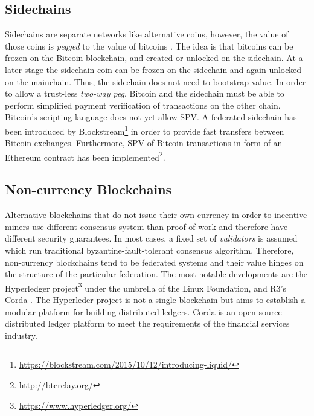 \subsection{Sidechains}
Sidechains are separate networks like alternative coins, however, the value of those coins is \emph{pegged} to the value of bitcoins \parencite{backenabling}. The idea is that bitcoins can be frozen on the Bitcoin blockchain, and created or unlocked on the sidechain. At a later stage the sidechain coin can be frozen on the sidechain and again unlocked on the mainchain. Thus, the sidechain does not need to bootstrap value.
In order to allow a trust-less \emph{two-way peg}, Bitcoin and the sidechain must be able to perform simplified payment verification of transactions on the other chain. Bitcoin's scripting language does not yet allow \ac{SPV}. A federated sidechain has been introduced by Blockstream\footnote{\url{https://blockstream.com/2015/10/12/introducing-liquid/}} in order to provide fast transfers between Bitcoin exchanges. Furthermore, \ac{SPV} of Bitcoin transactions in form of an Ethereum contract has been implemented\footnote{\url{http://btcrelay.org/}}.

\subsection{Non-currency Blockchains}

Alternative blockchains that do not issue their own currency in order to incentive miners use different consensus system than proof-of-work and therefore have different security guarantees. In most cases, a fixed set of \emph{validators} is assumed which run traditional byzantine-fault-tolerant consensus algorithm. Therefore, non-currency blockchains tend to be federated systems and their value hinges on the structure of the particular federation. The most notable developments are the Hyperledger project\footnote{\url{https://www.hyperledger.org/}} under the umbrella of the Linux Foundation, and R3's Corda \parencite{Brown2016corda}. The Hyperleder project is not a single blockchain but aims to establish a modular platform for building distributed ledgers. Corda is an open source distributed ledger platform to meet the requirements of the financial services industry.



